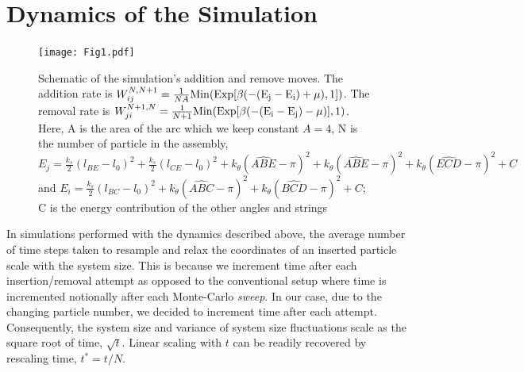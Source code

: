\documentclass[amsmath,preprintnumbers,10pt,nofootinbib,prl,twocolumn]{revtex4-1}
\begin{document}
\section{Dynamics of the Simulation}
\begin{figure}[tbp]
\texttt{[image: Fig1.pdf]}
\caption{ Schematic of the simulation's addition and remove moves. The addition rate is $W_{ij}^{N,N+1}=\frac{1}{NA} \rm{Min}(\rm{Exp}[\beta(-(E_j-E_i) +\mu),1])$. The removal rate is $W_{ji}^{N+1,N}=\frac{1}{N+1}\rm{Min}(\rm{Exp}[\beta(-(E_i-E_j) -\mu)],1)$. Here, A is the area of the arc which we keep constant $A=4$, N is the number of particle in the assembly, $E_j = \frac{k_s}{2}(l_{BE}-l_0)^2+\frac{k_s}{2}(l_{CE}-l_0)^2+k_\theta(\widehat{ABE}-\pi)^2+k_\theta(\widehat{ABE}-\pi)^2+k_\theta(\widehat{ECD}-\pi)^2+C$ and $E_i=\frac{k_s}{2}(l_{BC}-l_0)^2+k_\theta(\widehat{ABC}-\pi)^2+k_\theta(\widehat{BCD}-\pi)^2+C$; C is the energy contribution of the other angles and strings }
\label{fig:SimulationSchematic}
\end{figure}
In simulations performed with the dynamics described above, the average number of time steps taken to resample and relax the coordinates of an inserted particle scale with the system size. This is because we increment time after each insertion/removal attempt as opposed to the conventional setup where time is incremented notionally after each Monte-Carlo {\it sweep}. In our case, due to the changing particle number, we decided to increment time after each attempt. Consequently, the system size and variance of system size fluctuations scale as the square root of time, $\sqrt{t}$. Linear scaling with $t$ can be readily recovered by rescaling time, $t^*=t/N$.

\end{document}
